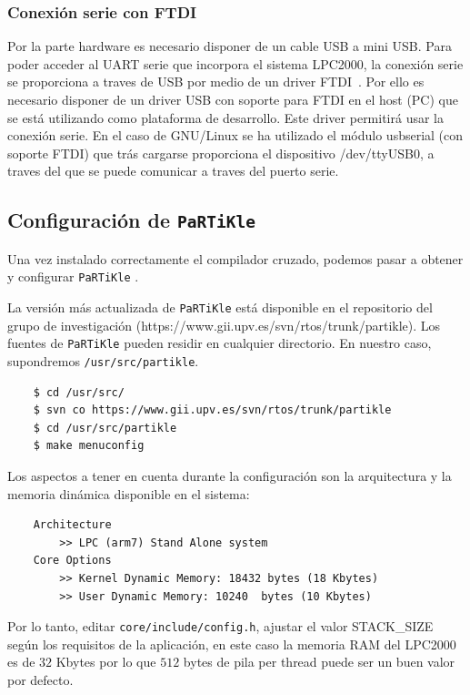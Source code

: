 \documentclass[10pt,a4paper]{article}
\newcommand{\partikle}[0]{\texttt{PaRTiKle}}
\begin{document}
	\subsubsection{Conexión serie con FTDI}

	Por la parte hardware es necesario disponer de un cable USB a mini USB. Para poder acceder al UART serie que incorpora el sistema LPC2000, la conexión serie se proporciona a traves de USB por medio de un driver FTDI~\cite{FTDI}. Por ello es necesario disponer de un driver USB con soporte para FTDI en el host (PC) que se está utilizando como plataforma de desarrollo. Este driver permitirá usar la conexión serie. En el caso de GNU/Linux se ha utilizado el módulo usbserial (con soporte FTDI) que trás cargarse proporciona el dispositivo /dev/ttyUSB0, a traves del que se puede comunicar a traves del puerto serie.
	
	
	\subsection{Configuración de \partikle{}}
			
	Una vez instalado correctamente el compilador cruzado, podemos pasar a obtener y configurar \partikle{} \cite{partikleos}.
	
	La versión más actualizada de \partikle{} está disponible en el repositorio del grupo de investigación (https://\-www.gii.upv.es/\-svn/\-rtos/\-trunk/\-partikle). Los fuentes de \partikle{} pueden residir en cualquier directorio. En nuestro caso, supondremos \texttt{/usr/\-src/\-partikle}.
	
	\begin{verbatim}
	$ cd /usr/src/
	$ svn co https://www.gii.upv.es/svn/rtos/trunk/partikle
	$ cd /usr/src/partikle
	$ make menuconfig
	\end{verbatim}

	Los aspectos a tener en cuenta durante la configuración son la arquitectura y la memoria dinámica disponible en el sistema:

	\begin{verbatim}
	Architecture 
	    >> LPC (arm7) Stand Alone system
	Core Options 
	    >> Kernel Dynamic Memory: 18432 bytes (18 Kbytes)
	    >> User Dynamic Memory: 10240  bytes (10 Kbytes)
	\end{verbatim}

	Por lo tanto, editar \texttt{core/include/config.h}, ajustar el valor STACK\_SIZE según los requisitos de la aplicación, en este caso la memoria RAM del LPC2000 es de $32$ Kbytes por lo que $512$ bytes de pila per thread puede ser un buen valor por defecto.
	
\end{document}
